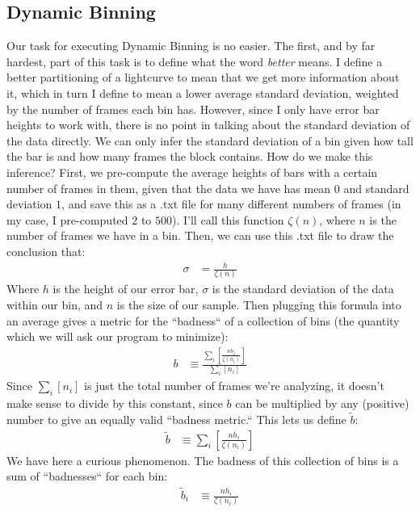\documentclass[12pt]{article}
\begin{document}
\subsection{Dynamic Binning}
\indent \indent Our task for executing Dynamic Binning is no easier. The first, and by far hardest, part of this task is to define what the word \textit{better} means. I define a better partitioning of a lightcurve to mean that we get more information about it, which in turn I define to mean a lower average standard deviation, weighted by the number of frames each bin has. However, since I only have error bar heights to work with, there is no point in talking about the standard deviation of the data directly. We can only infer the standard deviation of a bin given how tall the bar is and how many frames the block contains. How do we make this inference? First, we pre-compute the average heights of bars with a certain number of frames in them, given that the data we have has mean $ 0 $ and standard deviation $ 1 $, and save this as a .txt file for many different numbers of frames (in my case, I pre-computed $ 2 $ to $ 500 $). I'll call this function $ \zeta \left ( n \right ) $, where $ n $ is the number of frames we have in a bin. Then, we can use this .txt file to draw the conclusion that:
\begin{align}
\sigma & = \frac{h}{\zeta \left ( n \right )}
\end{align}
Where $ h $ is the height of our error bar, $ \sigma $ is the standard deviation of the data within our bin, and $ n $ is the size of our sample. Then plugging this formula into an average gives a metric for the ``badness`` of a collection of bins (the quantity which we will ask our program to minimize):
\begin{align}
b & \equiv \frac{\sum_{i} \left [ \frac{n h_{i}}{\zeta \left ( n_{i} \right )} \right ]}{\sum_{i} \left [ n_{i} \right ]}
\end{align}
Since $ \sum_{i} \left [ n_{i} \right ] $ is just the total number of frames we're analyzing, it doesn't make sense to divide by this constant, since $ b $ can be multiplied by any (positive) number to give an equally valid ``badness metric.`` This lets us define $ \tilde{b} $:
\begin{align}
\tilde{b} & \equiv \sum_{i} \left [ \frac{n h_{i}}{\zeta \left ( n_{i} \right )} \right ]
\end{align}
We have here a curious phenomenon. The badness of this collection of bins is a sum of ``badnesses`` for each bin:
\begin{align}
\tilde{b}_{i} & \equiv \frac{n h_{i}}{\zeta \left ( n_{i} \right )}
\end{align}
\end{document}
